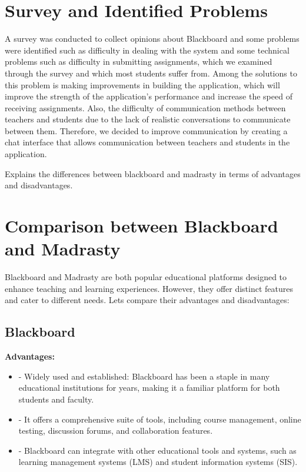 \documentclass[12pt]{article}
\begin{document}
\section{Survey and Identified Problems}

  A survey was conducted to collect opinions about Blackboard and some problems were identified such as difficulty in dealing with the system and some technical problems such as difficulty in submitting assignments, which we examined through the survey and which most students suffer from. Among the solutions to this problem is making improvements in building the application, which will improve the strength of the application's performance and increase the speed of receiving assignments. Also, the difficulty of communication methods between teachers and students due to the lack of realistic conversations to communicate between them. Therefore, we decided to improve communication by creating a chat interface that allows communication between teachers and students in the application.
  
  
  Explains the differences between blackboard and madrasty in terms of advantages and disadvantages.
  

\section{Comparison between Blackboard and Madrasty}

Blackboard and Madrasty are both popular educational platforms designed to enhance teaching and learning experiences. However, they offer distinct features and cater to different needs. Lets compare their advantages and disadvantages:

\subsection{Blackboard}

\textbf{Advantages:}
\begin{itemize}
\item -	Widely used and established: Blackboard has been a staple in many educational institutions for years, making it a familiar platform for both students and faculty.
\item -	It offers a comprehensive suite of tools, including course management, online testing, discussion forums, and collaboration features.
\item-	Blackboard can integrate with other educational tools and systems, such as learning management systems (LMS) and student information systems (SIS).

\end{itemize}
\end{document}
